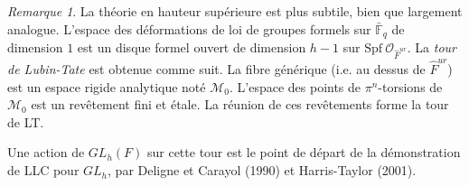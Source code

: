 \documentclass[11.8pt]{amsart}
\theoremstyle{plain}
\theoremstyle{definition}
\theoremstyle{remark}
\newtheorem*{rmq}{Remarque}
\begin{document}
\begin{rmq} La théorie en hauteur supérieure est plus subtile, bien que largement analogue. L'espace des déformations de loi de groupes formels sur $\bar{\mathbb F}_q$ de dimension $1$ est un disque formel ouvert de dimension $h-1$ sur $\mathrm{Spf} \ \mathcal O_{\hat F^{ur}}$. La \textit{tour de Lubin-Tate} est obtenue comme suit. La fibre générique (i.e. au dessus de $\hat{F}^{ur}$) est un espace rigide analytique noté $\mathcal M_0$. L'espace des points de $\pi^n$-torsions de $\mathcal M_0$ est un revêtement fini et étale. La réunion de ces revêtements forme la tour de LT. 

Une action de $GL_h(F)$ sur cette tour est le point de départ de la démonstration de LLC pour $GL_h$, par Deligne et Carayol (1990) et Harris-Taylor (2001).

\end{rmq}
\end{document}
